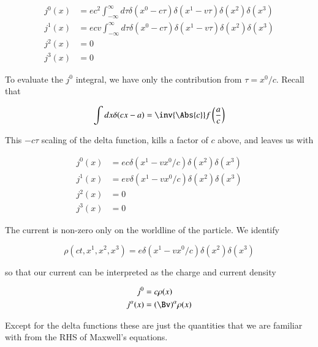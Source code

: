 \begin{align}\label{eqn:relativisticElectrodynamicsL12:490}
j^0(x) &= e c^2 \int_{-\infty}^\infty d\tau \delta(x^0 - c \tau) \delta(x^1 - v \tau) \delta(x^2) \delta(x^3) \\
j^1(x) &= e c v \int_{-\infty}^\infty d\tau \delta(x^0 - c \tau) \delta(x^1 - v \tau) \delta(x^2) \delta(x^3) \\
j^2(x) &= 0 \\
j^3(x) &= 0
\end{align}

To evaluate the $j^0$ integral, we have only the contribution from $\tau = x^0/c$.  Recall that 

\begin{equation}\label{eqn:relativisticElectrodynamicsL12:510}
\int dx \delta( cx - a) = \inv{\Abs{c}} f\left( \frac{a}{c} \right)
\end{equation}

This $-c\tau$ scaling of the delta function, kills a factor of $c$ above, and leaves us with

\begin{align}\label{eqn:relativisticElectrodynamicsL12:530}
j^0(x) &= e c \delta(x^1 - v x^0/c) \delta(x^2) \delta(x^3) \\
j^1(x) &= e v \delta(x^1 - v x^0/c) \delta(x^2) \delta(x^3) \\
j^2(x) &= 0 \\
j^3(x) &= 0 
\end{align}

The current is non-zero only on the worldline of the particle.  We identify

\begin{equation}\label{eqn:relativisticElectrodynamicsL12:550}
\rho(ct, x^1, x^2, x^3) = e \delta(x^1 - v x^0/c) \delta(x^2) \delta(x^3) 
\end{equation}

so that our current can be interpreted as the charge and current density 

\begin{align}\label{eqn:relativisticElectrodynamicsL12:570}
j^0 &= c \rho(x) \\
j^\alpha(x) &= (\Bv)^\alpha \rho(x)
\end{align}

Except for the delta functions these are just the quantities that we are familiar with from the RHS of Maxwell's equations.

\EndArticle
